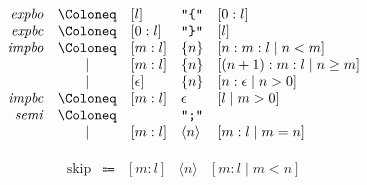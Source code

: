 \begin{align*}
  \begin{array}{rclll}
    \mathit{expbo}
    & \Coloneq & [l] &\text{\texttt{\textquotedbl\{\textquotedbl}} &[0:l] \\
    \mathit{expbc}
    & \Coloneq & [0:l] &\text{\texttt{\textquotedbl\}\textquotedbl}} &[l] \\
    \mathit{impbo}
    & \Coloneq & [m:l] &\{ n\} &[n:m:l \mid n < m] \\
    & \mid & [m:l] &\{ n\} &[(n + 1):m:l \mid n \geq m] \\
    & \mid & [\epsilon] &\{ n\} &[n:\epsilon \mid n > 0] \\
    \mathit{impbc}
    & \Coloneq & [m:l] &\epsilon &[l \mid m > 0] \\
    \mathit{semi}
    & \Coloneq & &\text{\texttt{\textquotedbl ;\textquotedbl}} \\
    & \mid & [m:l] & \langle n\rangle &[m:l \mid m = n]
  \end{array}
\end{align*}

\begin{align*}
  \begin{array}{rclll}
    \mathrm{skip}
    &\Coloneq & [m:l] &\langle n\rangle &[m:l \mid m < n]
  \end{array}
\end{align*}
